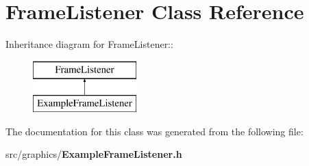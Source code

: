 \section{Frame\-Listener Class Reference}
\label{classFrameListener}
Inheritance diagram for Frame\-Listener::\begin{figure}[H]
\begin{center}
\leavevmode
\includegraphics[height=2cm]{classFrameListener}
\end{center}
\end{figure}


The documentation for this class was generated from the following file:\begin{CompactItemize}
\item 
src/graphics/{\bf Example\-Frame\-Listener.h}\end{CompactItemize}
